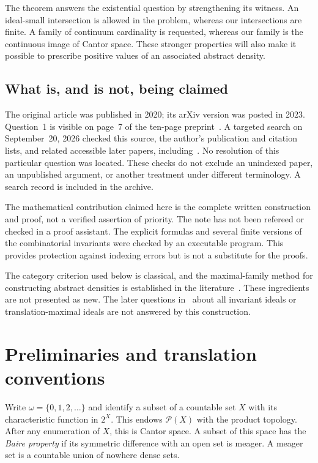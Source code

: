 \documentclass[11pt,a4paper]{article}
\theoremstyle{definition}
\theoremstyle{remark}
\newcommand{\Pow}{\mathcal P}
\begin{document}
The theorem answers the existential question by strengthening its
witness. An ideal-small intersection is allowed in the problem, whereas
our intersections are finite. A family of continuum cardinality is
requested, whereas our family is the continuous image of Cantor space.
These stronger properties will also make it possible to prescribe
positive values of an associated abstract density.

\subsection{What is, and is not, being claimed}
The original article was published in 2020; its arXiv version was posted
in 2023. Question~1 is visible on page~7 of the ten-page preprint~\cite{FT}.
A targeted search on September~20, 2026 checked this source, the author's
publication and citation lists, and related accessible later papers,
including~\cite{KL,Path}. No resolution of this particular question was
located. These checks do not exclude an unindexed paper, an unpublished
argument, or another treatment under different terminology. A search
record is included in the archive.

The mathematical contribution claimed here is the complete written
construction and proof, not a verified assertion of priority. The note
has not been refereed or checked in a proof assistant. The explicit
formulas and several finite versions of the combinatorial invariants
were checked by an executable program. This provides protection against
indexing errors but is not a substitute for the proofs.

The category criterion used below is classical, and the maximal-family
method for constructing abstract densities is established in the
literature~\cite{Talagrand,DNJ,FT}. These ingredients are not presented as
new. The later questions in~\cite{FT} about all invariant ideals or
translation-maximal ideals are not answered by this construction.

\section{Preliminaries and translation conventions}
\label{sec:prelim}

Write $\omega=\{0,1,2,\ldots\}$ and identify a subset of a countable set
$X$ with its characteristic function in $2^X$. This endows $\Pow(X)$ with
the product topology. After any enumeration of $X$, this is Cantor space.
A subset of this space has the \emph{Baire property} if its symmetric
difference with an open set is meager. A meager set is a countable union
of nowhere dense sets.
\end{document}
